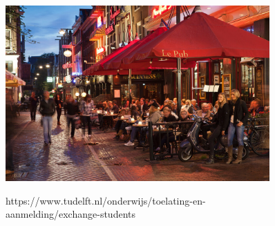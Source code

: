 \begin{frame}
    \delft
    \begin{figure}
        \includegraphics[width=0.9\textwidth]{images/lepub.jpg}
    \end{figure}
\end{frame}

\begin{frame}
    \delft
    \begin{figure}
        \centering
        \small https://www.tudelft.nl/onderwijs/toelating-en-aanmelding/exchange-students
    \end{figure}
\end{frame}



